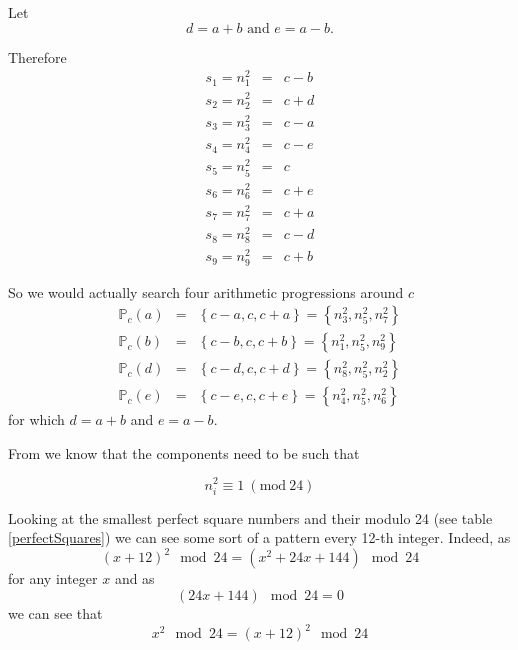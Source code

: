 \documentclass[reqno,10pt,a4paper]{article}
\begin{document}
	Let
	\begin{equation}
		d = a + b \text{ and } e = a - b \text{.}
	\end{equation}
	
	Therefore
	\begin{eqnarray}
		s_1 = n_1^2 &=& c - b \\
		s_2 = n_2^2 &=& c + d \\
		s_3 = n_3^2 &=& c - a \\
		s_4 = n_4^2 &=& c - e \\
		s_5 = n_5^2 &=& c \\
		s_6 = n_6^2 &=& c + e \\
		s_7 = n_7^2 &=& c + a \\
		s_8 = n_8^2 &=& c - d \\
		s_9 = n_9^2 &=& c + b
	\end{eqnarray}
	
	So we would actually search four arithmetic progressions around $c$
	\begin{eqnarray}
		\mathbb{P}_c(a) &=& \left\{ c - a, c, c + a \right\} = \left\{ n_3^2, n_5^2, n_7^2 \right\} \\
		\mathbb{P}_c(b) &=& \left\{ c - b, c, c + b \right\} = \left\{ n_1^2, n_5^2, n_9^2 \right\} \\
		\mathbb{P}_c(d) &=& \left\{ c - d, c, c + d \right\} = \left\{ n_8^2, n_5^2, n_2^2 \right\} \\
		\mathbb{P}_c(e) &=& \left\{ c - e, c, c + e \right\} = \left\{ n_4^2, n_5^2, n_6^2 \right\}
	\end{eqnarray}
	for which $d = a + b$ and $e = a - b$.

	\vspace{1em}
	
	From \cite{zimmermann2015} we know that the components need to be such that
	
	\begin{equation} \label{eq:conditionMod24}
		n_i^2 \equiv 1~(\textrm{mod}~24)
	\end{equation}
	
	Looking at the smallest perfect square numbers and their modulo 24 (see table \ref{perfectSquares}) we can see some sort of a pattern every 12-th integer. Indeed, as
	\begin{equation}
	(x + 12)^2 \mod 24 = (x^2 + 24x + 144) \mod 24
	\end{equation}
	for any integer $x$ and as
	\begin{equation}
	(24x + 144) \mod 24 = 0
	\end{equation}
	we can see that
	\begin{equation}
	x^2 \mod 24 = (x + 12)^2 \mod 24
	\end{equation}
	
\end{document}
